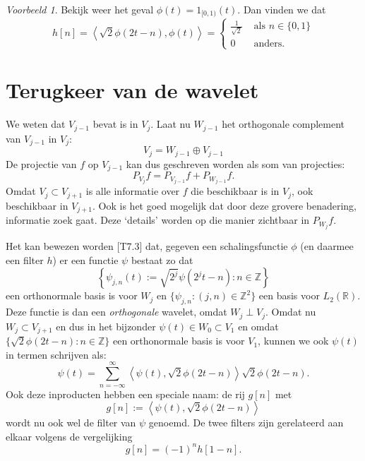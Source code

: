 \documentclass[11pt]{uvamath}
\newcommand{\R}{\mathbb{R}}
\newcommand{\Z}{\mathbb{Z}}
\theoremstyle{plain}
\theoremstyle{definition}
\theoremstyle{remark}
\newtheorem*{voorbeeld}{Voorbeeld}
\begin{document}
\begin{voorbeeld}
  Bekijk weer het geval $\phi(t) = 1_{[0,1)}(t)$. Dan vinden we dat
    \[
    h[n] = \left\langle \sqrt{2} \phi\left(2t-n\right), \phi(t) \right\rangle = \begin{cases} \frac{1}{\sqrt{2}} & \text{ als } n \in \{0,1\} \\ 0 & \text{ anders.} \end{cases}
    \]
\end{voorbeeld}

\section{Terugkeer van de wavelet}
We weten dat $V_{j-1}$ bevat is in $V_{j}$. Laat nu $W_{j-1}$ het orthogonale complement van $V_{j-1}$ in $V_{j}$:
\begin{equation}
  \label{ruimterec}
  V_{j} = W_{j-1} \oplus V_{j-1}
\end{equation}
De projectie van $f$ op $V_{j-1}$ kan dus geschreven worden als som van projecties:
\begin{equation}
  \label{projectie_rec}
  P_{V_{j}} f = P_{V_{j-1}} f + P_{W_{j-1}} f.
\end{equation}
Omdat $V_j \subset V_{j+1}$ is alle informatie over $f$ die beschikbaar is in $V_j$, ook beschikbaar in $V_{j+1}$. Ook is het goed mogelijk dat door deze grovere benadering, informatie zoek gaat. Deze `details' worden op die manier zichtbaar in $P_{W_j} f$.

Het kan bewezen worden \cite{mallat}[T7.3] dat, gegeven een schalingsfunctie $\phi$ (en daarmee een filter $h$) er een functie $\psi$ bestaat zo dat
\[
\left\{ \psi_{j,n}(t) := \sqrt{2^j} \psi\left(2^jt - n\right) : n \in \Z \right\}
\] een orthonormale basis is voor $W_j$ en $\{ \psi_{j,n}: (j,n) \in \Z^2 \}$ een basis voor $L_2(\R)$. Deze functie is dan een \emph{orthogonale} wavelet, omdat $W_j \perp V_j$.
Omdat nu $W_j \subset V_{j+1}$ en dus in het bijzonder $\psi(t) \in W_0 \subset V_1$ en omdat $\{ \sqrt{2}\phi(2t-n): n \in \Z \}$ een orthonormale basis is voor $V_1$, kunnen we ook $\psi(t)$ in termen schrijven als:
\[
\psi\left(t\right) = \sum_{n=-\infty}^{\infty} \left\langle \psi\left(t\right), \sqrt{2}\phi(2t-n) \right\rangle \sqrt{2}\phi(2t-n).
\]
Ook deze inproducten hebben een speciale naam: de rij $g[n]$ met
\[
g[n] := \left\langle \psi\left(t\right), \sqrt{2}\phi(2t-n) \right\rangle
\]
wordt nu ook wel de filter van $\psi$ genoemd. De twee filters zijn gerelateerd aan elkaar volgens de vergelijking\cite{wavelet_filter[V13]}\cite{daubechies[P958]}
\[
g[n] = (-1)^{n}h[1-n].
\]
\end{document}
